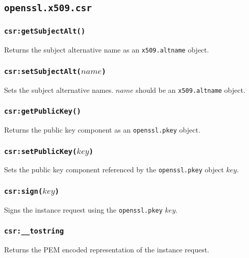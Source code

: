 \documentclass[11pt, oneside]{memoir}
\newcommand*{\fn}[1]{\texttt{#1}\xspace}
\newcommand*{\module}[1]{\texttt{#1}\xspace}
\newcounter{toccols}
\newenvironment{Module}[1]{
	\subsection{\texttt{#1}}
	\addtocontents{toc}{
		\protect\begin{multicols}{\value{toccols}}
	}
}{
	\addtocontents{toc}{\protect\end{multicols}}
}
\begin{document}
\begin{Module}{openssl.x509.csr}
\subsubsection[\fn{csr:getSubjectAlt}]{\fn{csr:getSubjectAlt()}}

Returns the subject alternative name as an \module{x509.altname} object.

\subsubsection[\fn{csr:setSubjectAlt}]{\fn{csr:setSubjectAlt($name$)}}

Sets the subject alternative names. $name$ should be an \module{x509.altname} object.

\subsubsection[\fn{csr:getPublicKey}]{\fn{csr:getPublicKey()}}

Returns the public key component as an \module{openssl.pkey} object.

\subsubsection[\fn{csr:setPublicKey}]{\fn{csr:setPublicKey($key$)}}

Sets the public key component referenced by the \module{openssl.pkey} object $key$.

\subsubsection[\fn{csr:sign}]{\fn{csr:sign($key$)}}

Signs the instance request using the \module{openssl.pkey} $key$.

\subsubsection[\fn{csr:\_\_tostring}]{\fn{csr:\_\_tostring}}

Returns the PEM encoded representation of the instance request.

\end{Module}
\end{document}
